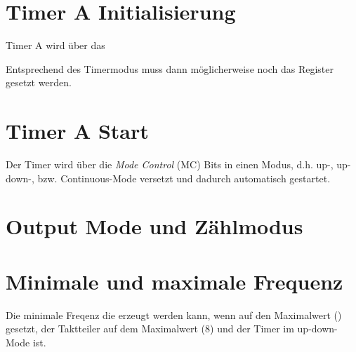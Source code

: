 \documentclass[a4paper, 12pt]{article}
\begin{document}
  
  \clearpage
  \setcounter{page}{1}
  \section{Timer A Initialisierung}
  Timer A wird über das 

  Entsprechend des Timermodus muss dann möglicherweise noch das  Register
  gesetzt werden.
  
  \section{Timer A Start}
  Der Timer wird über die \emph{Mode Control} (MC) Bits in einen Modus, d.h.
  up-, up-down-, bzw. Continuous-Mode versetzt und dadurch automatisch gestartet.  

  \section{Output Mode und Zählmodus}

  \section{Minimale und maximale Frequenz}
  Die minimale Freqenz die erzeugt werden kann, wenn  auf den
  Maximalwert () gesetzt, der Taktteiler auf dem Maximalwert
  (8) und der Timer im up-down-Mode ist.


 
\end{document}
